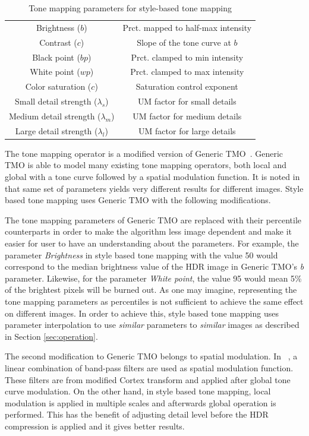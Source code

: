 \begin{table}
\caption{Tone mapping parameters for style-based tone mapping}
\label{tab:tonemap_parameters}
\centering
\begin{tabular}{|c|c|}
\hline 
Brightness ($b$) & Prct. mapped to half-max intensity \\
Contrast ($c$) & Slope of the tone curve at $b$ \\
Black point ($bp$) & Prct. clamped to min intensity \\
White point ($wp$) & Prct. clamped to max intensity \\
Color saturation ($c$) & Saturation control exponent \\
\hline
Small detail strength ($\lambda_s$) & UM factor for small details \\
Medium detail strength ($\lambda_m$) & UM factor for medium details \\
Large detail strength ($\lambda_l$) & UM factor for large details \\
\hline
\end{tabular}
\end{table}

The tone mapping operator is a modified version of Generic TMO~\cite{mantiuk2008modeling}. Generic TMO is able to model many existing tone mapping operators, both local and global with a tone curve followed by a spatial modulation function. It is noted in~\cite{mantiuk2008modeling} that same set of parameters yields very different results for different images. Style based tone mapping uses Generic TMO with the following modifications.

The tone mapping parameters of Generic TMO are replaced with their percentile counterparts in order to make the algorithm less image dependent and make it easier for user to have an understanding about the parameters. For example, the parameter \emph{Brightness} in style based tone mapping with the value 50 would correspond to the median brightness value of the HDR image in Generic TMO's \emph{b} parameter. Likewise, for the parameter \emph{White point}, the value 95 would mean 5\% of the brightest pixels will be burned out. As one may imagine, representing the tone mapping parameters as percentiles is not sufficient to achieve the same effect on different images. In order to achieve this, style based tone mapping uses parameter interpolation to use \emph{similar} parameters to \emph{similar} images as described in Section \ref{sec:operation}. 

The second modification to Generic TMO belongs to spatial modulation. In ~\cite{mantiuk2008modeling}, a linear combination of band-pass filters are used as spatial modulation function. These filters are from modified Cortex transform and applied after global tone curve modulation. On the other hand, in style based tone mapping, local modulation is applied in multiple scales and afterwards global operation is performed. This has the benefit of adjusting detail level before the HDR compression is applied and it gives better results. 

